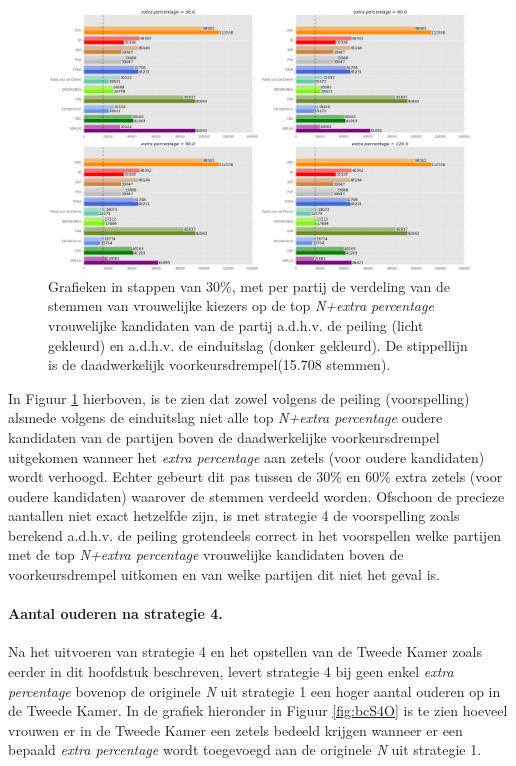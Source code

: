   
\begin{figure}[H]

	\includegraphics[width=\linewidth]	{stemmen_op_ouderen_topNextrapercentage_samen.png}

			\caption{Grafieken in stappen van 30\%, met per partij de verdeling van de stemmen van vrouwelijke kiezers op de top \textit{N+extra percentage} vrouwelijke kandidaten van de partij a.d.h.v. de peiling (licht gekleurd) en a.d.h.v. de einduitslag (donker gekleurd). De stippellijn is de daadwerkelijk voorkeursdrempel(15.708 stemmen).} 

\label{fig:stemmenS4O}
\end{figure}

In Figuur \ref{fig:stemmenS4O} hierboven, is te zien dat zowel volgens de peiling (voorspelling) alsmede volgens de einduitslag niet alle top \textit{N+extra percentage} oudere kandidaten van de partijen boven de daadwerkelijke voorkeursdrempel uitgekomen wanneer het \textit{extra percentage} aan zetels (voor oudere kandidaten) wordt verhoogd. Echter gebeurt dit pas tussen de 30\%  en 60\% extra zetels (voor oudere kandidaten) waarover de stemmen verdeeld worden. Ofschoon de precieze aantallen niet exact hetzelfde zijn, is met strategie 4 de voorspelling zoals berekend a.d.h.v. de peiling grotendeels correct in het voorspellen welke partijen met de top \textit{N+extra percentage} vrouwelijke kandidaten boven de voorkeursdrempel uitkomen en van welke partijen dit niet het geval is.



\paragraph{Aantal ouderen na strategie 4.}
Na het uitvoeren van strategie 4 en het opstellen van de Tweede Kamer zoals eerder in dit hoofdstuk beschreven, levert strategie 4 bij geen enkel \textit{extra percentage} bovenop de originele \textit{N} uit strategie 1 een hoger aantal ouderen op in de Tweede Kamer. In de grafiek hieronder in Figuur \ref{fig:bcS4O}  is te zien hoeveel vrouwen er in de Tweede Kamer een zetels bedeeld krijgen wanneer er een bepaald \textit{extra percentage} wordt toegevoegd aan de originele \textit{N} uit strategie 1.



